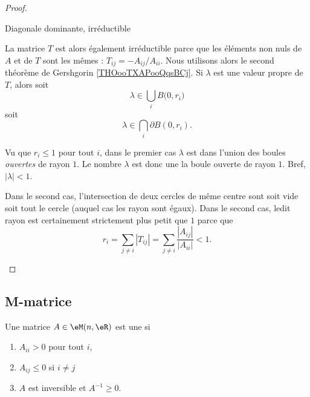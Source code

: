 \begin{proof}
\begin{subproof}
    \item[Diagonale dominante, irréductible]

        La matrice \( T\) est alors également irréductible parce que les éléments non nuls de \( A\) et de \( T\) sont les mêmes : \( T_{ij}=-A_{ij}/A_{ii}\). Nous utilisons alors le second théorème de Gershgorin \ref{THOooTXAPooQqsBCj}. Si \( \lambda\) est une valeur propre de \( T\), alors soit
        \begin{equation}
            \lambda\in\bigcup_iB\big( 0,r_i \big)
        \end{equation}
        soit
        \begin{equation}
            \lambda\in\bigcap_i\partial B(0,r_i).
        \end{equation}

        Vu que \( r_i\leq 1\) pour tout \( i\), dans le premier cas \( \lambda\) est dans l'union des boules \emph{ouvertes} de rayon \( 1\). Le nombre \( \lambda\) est donc une la boule ouverte de rayon \( 1\). Bref, \( | \lambda |<1\).

        Dans le second cas, l'intersection de deux cercles de même centre sont soit vide soit tout le cercle (auquel cas les rayon sont égaux). Dans le second cas, ledit rayon est certainement strictement plus petit que \( 1\) parce que
        \begin{equation}
            r_i=\sum_{j\neq i}| T_{ij} |=\sum_{j\neq i}\frac{ | A_{ij} | }{ | A_{ii} | }<1.
        \end{equation}
    \end{subproof}
\end{proof}

\subsection{M-matrice}

\begin{definition}
    Une matrice \( A\in \eM(n,\eR)\) est une  si
    \begin{enumerate}
        \item
            \( A_{ii}>0\) pour tout \( i\),
        \item
            \( A_{ij}\leq 0\) si \( i\neq j\)
        \item
            \( A\) est inversible et \( A^{-1}\geq 0\).
    \end{enumerate}
\end{definition}


